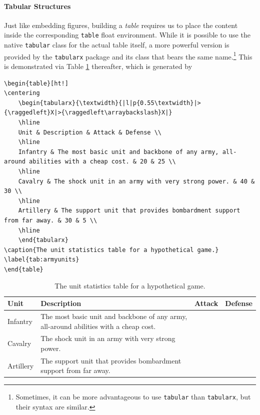 \paragraph{Tabular Structures}
Just like embedding figures, building a \textit{table} requires us to place the content inside the corresponding \verb|table| float environment. While it is possible to use the native \verb|tabular| class for the actual table itself, a more powerful version is provided by the \verb|tabularx| package and its class that bears the same name.\footnote{Sometimes, it can be more advantageous to use \texttt{tabular} than \texttt{tabularx}, but their syntax are similar.} This is demonstrated via Table \ref{tab:armyunits} thereafter, which is generated by
\begin{lstlisting}
\begin{table}[ht!]
\centering
    \begin{tabularx}{\textwidth}{|l|p{0.55\textwidth}|>{\raggedleft}X|>{\raggedleft\arraybackslash}X|}
    \hline
    Unit & Description & Attack & Defense \\
    \hline
    Infantry & The most basic unit and backbone of any army, all-around abilities with a cheap cost. & 20 & 25 \\
    \hline
    Cavalry & The shock unit in an army with very strong power. & 40 & 30 \\
    \hline
    Artillery & The support unit that provides bombardment support from far away. & 30 & 5 \\
    \hline
    \end{tabularx}
\caption{The unit statistics table for a hypothetical game.}
\label{tab:armyunits}
\end{table}
\end{lstlisting}
\begin{table}[ht!]
\centering
\begin{tabularx}{\textwidth}{|l|p{}|>{\raggedleft}X|>{\raggedleft\arraybackslash}X|}
\hline
Unit & Description & Attack & Defense \\
\hline
Infantry & The most basic unit and backbone of any army, all-around abilities with a cheap cost. & 20 & 25 \\
\hline
Cavalry & The shock unit in an army with very strong power. & 40 & 30 \\
\hline
Artillery & The support unit that provides bombardment support from far away. & 30 & 5 \\
\hline
\end{tabularx}
\caption{The unit statistics table for a hypothetical game.}
\label{tab:armyunits}
\end{table}
